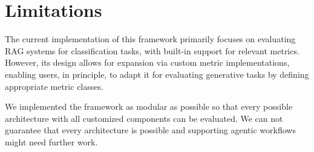 \section{Limitations}

The current implementation of this framework primarily focuses on evaluating RAG systems for classification tasks, with built-in support for relevant metrics. However, its design allows for expansion via custom metric implementations, enabling users, in principle, to adapt it for evaluating generative tasks by defining appropriate metric classes.

We implemented the framework as modular as possible so that every possible architecture with all customized components can be evaluated. We can not guarantee that every architecture is possible and supporting agentic workflows might need further work.




